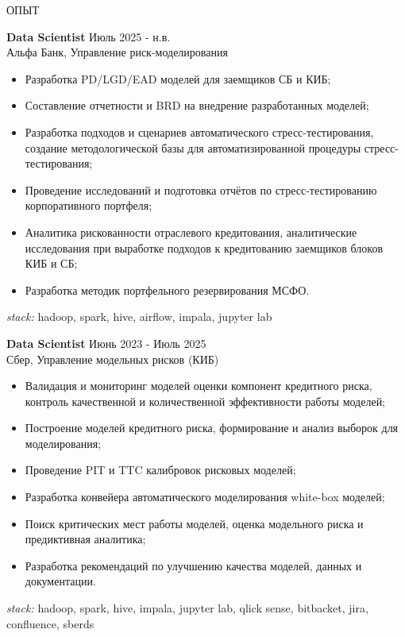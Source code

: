 \documentclass{resume} %
\begin{document}
\begin{rSection}{ОПЫТ}

\textbf{Data Scientist} \hfill Июль 2025 - н.в. \\ 
Альфа Банк, Управление риск-моделирования
 \begin{itemize}
    \itemsep -3pt {}
\item Разработка PD/LGD/EAD моделей для заемщиков СБ и КИБ;
\item Составление отчетности и BRD на внедрение разработанных моделей;
\item Разработка подходов и сценариев автоматического стресс-тестирования, создание методологической базы для автоматизированной процедуры стресс-тестирования;
\item Проведение исследований и подготовка отчётов по стресс-тестированию корпоративного портфеля;
\item Аналитика рискованности отраслевого кредитования, аналитические исследования при выработке подходов к кредитованию заемщиков блоков КИБ и СБ;
\item Разработка методик портфельного резервирования МСФО.
 \end{itemize}

\textit{stack:} hadoop, spark, hive, airflow, impala, jupyter lab

\textbf{Data Scientist} \hfill Июнь 2023 - Июль 2025 \\ 
Сбер, Управление модельных рисков (КИБ)
 \begin{itemize}
    \itemsep -3pt {}
\item Валидация и мониторинг моделей оценки компонент кредитного риска, контроль качественной и количественной эффективности работы моделей;
\item Построение моделей кредитного риска, формирование и анализ выборок для моделирования;
\item Проведение PIT и TTC калибровок рисковых моделей;
\item Разработка конвейера автоматического моделирования white-box моделей;
\item Поиск критических мест работы моделей, оценка модельного риска и предиктивная аналитика;
\item Разработка рекомендаций по улучшению качества моделей, данных и документации.
 \end{itemize}

\textit{stack:} hadoop, spark, hive, impala, jupyter lab, qlick sense, bitbacket, jira, confluence, sberds

\end{rSection}
\end{document}
